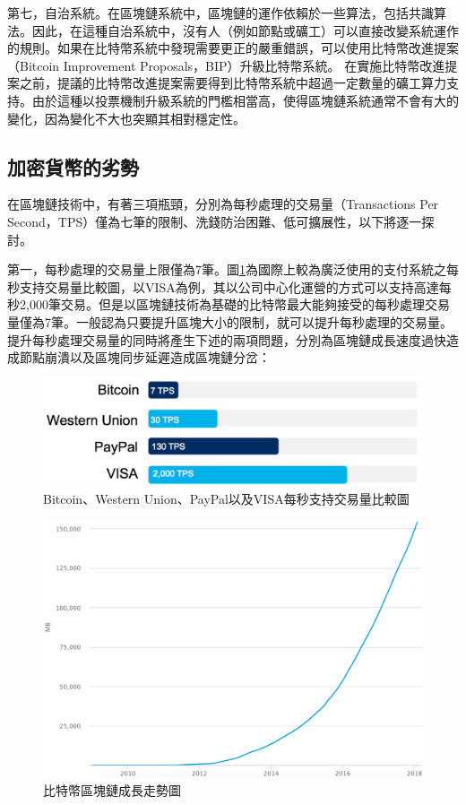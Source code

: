 				第七，自治系統。在區塊鏈系統中，區塊鏈的運作依賴於一些算法，包括共識算法。因此，在這種自治系統中，沒有人（例如節點或礦工）可以直接改變系統運作的規則。如果在比特幣系統中發現需要更正的嚴重錯誤，可以使用比特幣改進提案（Bitcoin Improvement Proposals，BIP）\supercite{BitcoinImprovementProposals}升級比特幣系統。 在實施比特幣改進提案之前，提議的比特幣改進提案需要得到比特幣系統中超過一定數量的礦工算力支持。由於這種以投票機制升級系統的門檻相當高，使得區塊鏈系統通常不會有大的變化，因為變化不⼤也突顯其相對穩定性。

			\subsection{加密貨幣的劣勢}
			在區塊鏈技術中，有著三項瓶頸，分別為每秒處理的交易量（Transactions Per Second，TPS）僅為七筆的限制、洗錢防治困難、低可擴展性，以下將逐一探討。

				第一，每秒處理的交易量上限僅為7筆。圖\ref{TPS}為國際上較為廣泛使用的⽀付系統之每秒⽀持交易量⽐較圖，以VISA為例，其以公司中心化運營的方式可以支持高達每秒2,000筆交易。但是以區塊鏈技術為基礎的比特幣最大能夠接受的每秒處理交易量僅為7筆。一般認為只要提升區塊大小的限制，就可以提升每秒處理的交易量。提升每秒處理交易量的同時將產生下述的兩項問題，分別為區塊鏈成長速度過快造成節點崩潰以及區塊同步延遲造成區塊鏈分岔：

					\begin{figure}[!htbp]
						\centering
						\includegraphics[width = .6\textwidth]{TPS.png}
						\caption{Bitcoin、Western Union\supercite{WesternUnion}、PayPal\supercite{PayPal}以及VISA每秒支持交易量比較圖\supercite{digibyte}}\label{TPS}
					\end{figure}

					\begin{figure}[!htbp]
						\centering
						\includegraphics[width = .8\textwidth]{blockchainsize.png}
						\caption{比特幣區塊鏈成長走勢圖\supercite{blockchainsize}}\label{blockchainsize}
					\end{figure}


